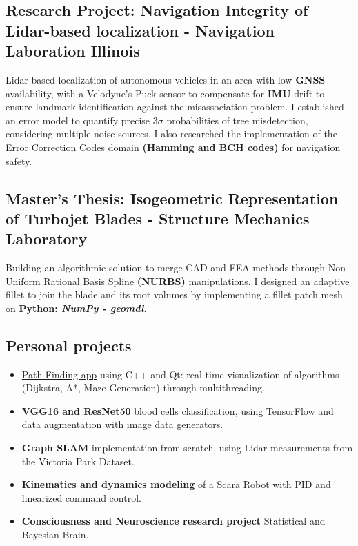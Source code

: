 \documentclass[]{article}
\begin{document}
\subsection{Research Project: Navigation Integrity of Lidar-based localization - Navigation Laboration Illinois}
Lidar-based localization of autonomous vehicles in an area with low \textbf{GNSS} availability, with a Velodyne's Puck sensor to compensate for \textbf{IMU} drift to ensure landmark identification against the misassociation problem.
I established an error model to quantify precise $3\sigma $ probabilities of tree misdetection, considering multiple noise sources. 
I also researched the implementation of the Error Correction Codes domain \textbf{(Hamming and BCH codes)} for navigation safety.\\


\subsection{Master's Thesis: Isogeometric Representation of Turbojet Blades - Structure Mechanics Laboratory}
Building an algorithmic solution to merge CAD and FEA methods through Non-Uniform Rational Basis Spline \textbf{(NURBS)} manipulations. 
I designed an adaptive fillet to join the blade and its root volumes by implementing a fillet patch mesh on \textbf{Python: \textit{NumPy - geomdl}}.

\vspace{1ex}

\subsection{Personal projects}
\begin{itemize}
    \item \href{https://github.com/NathanTouboul/PathPlanning}{Path Finding app}  using C++ and Qt: real-time visualization of algorithms (Dijkstra, A*, Maze Generation) through multithreading.
    \item \textbf{VGG16 and ResNet50} blood cells classification, using TensorFlow and data augmentation with image data generators.
    \item \textbf{Graph SLAM} implementation from scratch, using Lidar measurements from the Victoria Park Dataset.
    \item \textbf{Kinematics and dynamics modeling} of a Scara Robot with PID and linearized command control.
    \item \textbf{Consciousness and Neuroscience research project} Statistical and Bayesian Brain.
\end{itemize}
\end{document}
